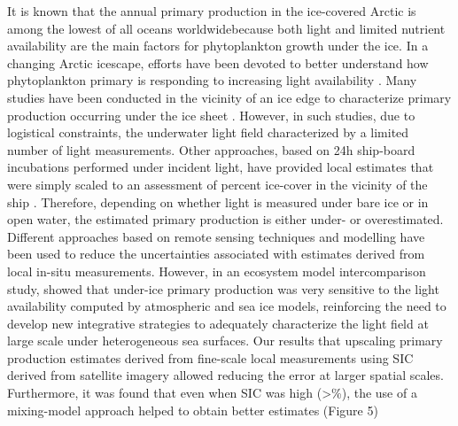 It is known that the annual primary production in the ice-covered Arctic is among the lowest of all oceans worldwide\DIFaddbegin \DIFadd{, }\DIFaddend because both light and limited nutrient availability are the main \DIFdelbegin {}\DIFdelend \DIFaddbegin {}\DIFaddend factors for phytoplankton growth under the ice. In a changing Arctic icescape, efforts have been devoted to better understand how phytoplankton primary \DIFdelbegin {}\DIFdelend \DIFaddbegin {}\DIFaddend is responding to increasing light availability \DIFaddbegin {}\DIFaddend . Many studies have been conducted in the vicinity of an ice edge to characterize primary production occurring under the ice sheet \citep{Arrigo2012, Arrigo2014, Mundy2009}. However, in such studies, due to logistical constraints, the underwater light field \DIFdelbegin {}\DIFdelend \DIFaddbegin {}\DIFaddend characterized by a limited number of light measurements. Other approaches, based on 24h ship-board incubations performed under incident light, have provided local estimates that were simply scaled to an assessment of percent ice-cover in the vicinity of the ship \citep{Smith1995, Gosselin1997, Mei2003}. Therefore, depending on whether light is measured under bare ice or in open water, the estimated primary production is either under- or overestimated. Different approaches based on remote sensing techniques and modelling have been used to reduce the \DIFdelbegin {}\DIFdelend uncertainties associated with estimates derived from local in-situ measurements. However, in an ecosystem model intercomparison study, \citet{Jin2015} showed that under-ice primary production was very sensitive to the light availability computed by atmospheric and sea ice models, reinforcing the need to develop new integrative strategies to adequately characterize the light field at large scale under heterogeneous sea \DIFaddbegin {}\DIFaddend surfaces. Our results \DIFdelbegin {}\DIFdelend \DIFaddbegin {}\DIFaddend that upscaling primary production estimates derived from fine-scale local measurements using SIC derived from satellite imagery allowed reducing the error at larger spatial scales. Furthermore, it was found that even when SIC was high (\textgreater\DIFaddbegin \DIFadd{~}\%), the use of a mixing-model approach helped to obtain better estimates (Figure 5)\DIFaddbegin {}

